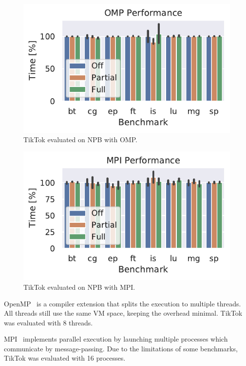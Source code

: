 \documentclass[conference]{IEEEtran}
\newcommand{\sysname}{TikTok}
\begin{document}
\begin{figure}[]
  \centering
  \includegraphics[width=\linewidth]{img/omp_graph.pdf}
  \caption{\sysname{} evaluated on NPB with OMP.
}
  \label{fig:npbomp}
\end{figure}

\begin{figure}[]
  \centering
  \includegraphics[width=\linewidth]{img/mpi_graph.pdf}
  \caption{\sysname{} evaluated on NPB with MPI.}
  \label{fig:npbmpi}
\end{figure}


OpenMP~\cite{dagum1998openmp} is a compiler extension that splits the execution
to multiple threads. All threads still use the same VM space, keeping the
overhead minimal. \sysname{} was evaluated with 8 threads.

MPI~\cite{snir1998mpi} implements parallel execution by launching multiple
processes which communicate by message-passing. Due to the limitations of some
benchmarks, \sysname{} was evaluated with 16 processes.
\end{document}

